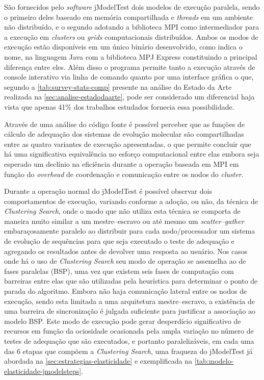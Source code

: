 \documentclass[english,brazilian]{UNISINOSmonografia} %
\begin{document}
São fornecidos pelo \textit{software} jModelTest dois modelos de execução paralela, sendo o primeiro deles baseado em memória compartilhada e \textit{threads} em um ambiente não distribuído, e o segundo adotando a biblioteca MPI como intermediador para a execução em \textit{clusters} ou \textit{grids} computacionais distribuídos.
Ambos os modos de execução estão disponíveis em um único binário desenvolvido, como indica o nome, na linguagem Java com a biblioteca MPJ Express \cite{Baker2006} constituindo a principal diferença entre eles.
Além disso o programa permite tanto a execução através de console interativo via linha de comando quanto por uma interface gráfica o que, segundo a \autoref{tab:survey-stats-comp} presente na análise do Estado da Arte realizada na \autoref{sec:analise-estadodaarte}, pode ser considerado um diferencial haja vista que apenas 41\% dos trabalhos estudados fornecia essa possibilidade.


Através de uma análise do código fonte é possível perceber que as funções de cálculo  de adequação dos sistemas de evolução molecular são compartilhadas entre as quatro variantes de execução apresentadas, o que permite concluir que há uma significativa equivalência no esforço computacional entre elas embora seja esperado um declínio na eficiência durante a operação baseada em MPI em função do \textit{overhead} de coordenação e comunicação entre os nodos do \textit{cluster}.


Durante a operação normal do jModelTest é possível observar dois comportamentos de execução, variando conforme a adoção, ou não, da técnica de \textit{Clustering Search}, onde o modo que não utiliza esta técnica se comporta de maneira muito similar a um mestre--escravo ou até mesmo um \textit{scatter--gather} embaraçosamente paralelo ao distribuir para cada nodo/processador um sistema de evolução de sequências para que seja executado o teste de adequação e agregando os resultados antes de devolver uma resposta ao usuário.
Nos casos onde há o uso de \textit{Clustering Search} seu modo de operação se assemelha ao de fases paralelas (BSP), uma vez que existem seis fases de computação com barreiras entre elas que são utilizadas pela heurística para determinar o ponto de parada do algoritmo.
Embora não haja comunicação lateral entre os nodos de execução, sendo esta limitada a uma arquitetura mestre--escravo, a existência de uma barreira de sincronização é julgada suficiente para justificar a associação ao modelo BSP.
Este modo de execução pode gerar desperdício significativo de recursos em função da ociosidade ocasionada pela ampla variação no número de testes de adequação que são executados, e portanto paralelizáveis, em cada uma das 6 etapas que compõem a \textit{Clustering Search}, uma fraqueza do jModelTest já abordada na \autoref{sec:estrategias-elasticidade} e exemplificada na \autoref{tab:modelo-elasticidade-jmodelsteps}.
\end{document}
